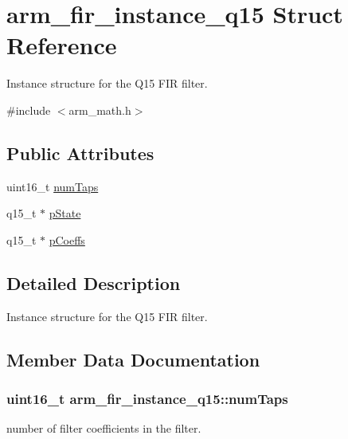 \hypertarget{structarm__fir__instance__q15}{}\section{arm\+\_\+fir\+\_\+instance\+\_\+q15 Struct Reference}
\label{structarm__fir__instance__q15}


Instance structure for the Q15 F\+IR filter.  




{\ttfamily \#include $<$arm\+\_\+math.\+h$>$}

\subsection*{Public Attributes}
\begin{DoxyCompactItemize}
\item 
uint16\+\_\+t \hyperlink{structarm__fir__instance__q15_a0e46f93cf51bfb18b1be808be9c5bfc9}{num\+Taps}
\item 
q15\+\_\+t $\ast$ \hyperlink{structarm__fir__instance__q15_aa8d25f44f45b6a6c4cf38c31569b8a01}{p\+State}
\item 
q15\+\_\+t $\ast$ \hyperlink{structarm__fir__instance__q15_a6d16db16a5f8f0db54938f2967244d9e}{p\+Coeffs}
\end{DoxyCompactItemize}


\subsection{Detailed Description}
Instance structure for the Q15 F\+IR filter. 

\subsection{Member Data Documentation}
\subsubsection[{\texorpdfstring{num\+Taps}{numTaps}}]{\setlength{\rightskip}{0pt plus 5cm}uint16\+\_\+t arm\+\_\+fir\+\_\+instance\+\_\+q15\+::num\+Taps}\hypertarget{structarm__fir__instance__q15_a0e46f93cf51bfb18b1be808be9c5bfc9}{}\label{structarm__fir__instance__q15_a0e46f93cf51bfb18b1be808be9c5bfc9}
number of filter coefficients in the filter. 
